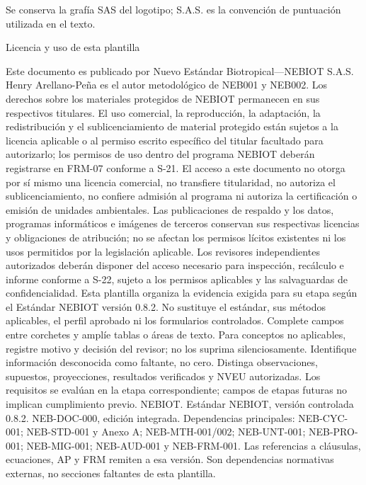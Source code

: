 {\sffamily\fontsize{7.5}{9.5}\selectfont\color{NEBGray}Se conserva la grafía SAS del logotipo; S.A.S. es la convención de puntuación utilizada en el texto.\par}
\clearpage
{\fontsize{23}{27}\selectfont\color{NEBGreen}Licencia y uso de esta plantilla\par}
\vspace{5mm}
Este documento es publicado por Nuevo Estándar Biotropical—NEBIOT S.A.S. Henry Arellano-Peña es el autor metodológico de NEB001 y NEB002. Los derechos sobre los materiales protegidos de NEBIOT permanecen en sus respectivos titulares. El uso comercial, la reproducción, la adaptación, la redistribución y el sublicenciamiento de material protegido están sujetos a la licencia aplicable o al permiso escrito específico del titular facultado para autorizarlo; los permisos de uso dentro del programa NEBIOT deberán registrarse en FRM-07 conforme a S-21. El acceso a este documento no otorga por sí mismo una licencia comercial, no transfiere titularidad, no autoriza el sublicenciamiento, no confiere admisión al programa ni autoriza la certificación o emisión de unidades ambientales. Las publicaciones de respaldo y los datos, programas informáticos e imágenes de terceros conservan sus respectivas licencias y obligaciones de atribución; no se afectan los permisos lícitos existentes ni los usos permitidos por la legislación aplicable. Los revisores independientes autorizados deberán disponer del acceso necesario para inspección, recálculo e informe conforme a S-22, sujeto a los permisos aplicables y las salvaguardas de confidencialidad.
Esta plantilla organiza la evidencia exigida para su etapa según el Estándar NEBIOT versión 0.8.2. No sustituye el estándar, sus métodos aplicables, el perfil aprobado ni los formularios controlados. Complete campos entre corchetes y amplíe tablas o áreas de texto. Para conceptos no aplicables, registre motivo y decisión del revisor; no los suprima silenciosamente. Identifique información desconocida como faltante, no cero. Distinga observaciones, supuestos, proyecciones, resultados verificados y NVEU autorizadas. Los requisitos se evalúan en la etapa correspondiente; campos de etapas futuras no implican cumplimiento previo.
{\sffamily\fontsize{9}{11}\selectfont [1] NEBIOT. Estándar NEBIOT, versión controlada 0.8.2. NEB-DOC-000, edición integrada. Dependencias principales: NEB-CYC-001; NEB-STD-001 y Anexo A; NEB-MTH-001/002; NEB-UNT-001; NEB-PRO-001; NEB-MIG-001; NEB-AUD-001 y NEB-FRM-001. Las referencias a cláusulas, ecuaciones, AP y FRM remiten a esa versión. Son dependencias normativas externas, no secciones faltantes de esta plantilla.}
